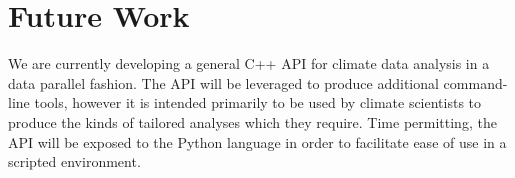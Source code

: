 \section{Future Work}
\label{section:future}

We are currently developing a general C++ API for climate data analysis in a
data parallel fashion.  The API will be leveraged to produce additional
command-line tools, however it is intended primarily to be used by climate
scientists to produce the kinds of tailored analyses which they require.  Time
permitting, the API will be exposed to the Python language in order to
facilitate ease of use in a scripted environment.
